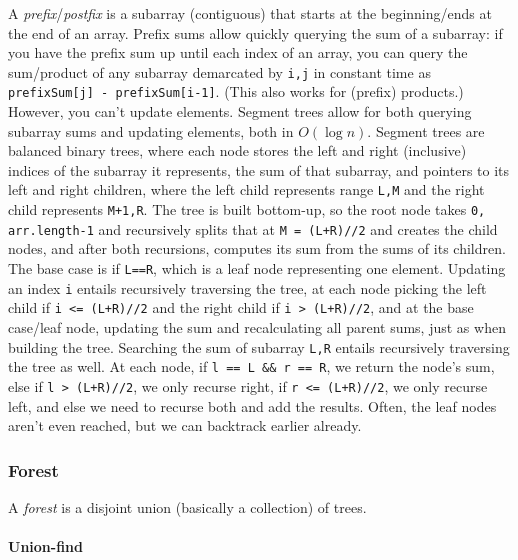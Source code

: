 \documentclass[table, xcdraw]{article}%
\begin{document}
A \emph{prefix}/\emph{postfix} is a subarray (contiguous) that starts at the beginning/ends at the end of an array. Prefix sums allow quickly querying the sum of a subarray: if you have the prefix sum up until each index of an array, you can query the sum/product of any subarray demarcated by \texttt{i,j} in constant time as \texttt{prefixSum[j] - prefixSum[i-1]}. (This also works for (prefix) products.) However, you can't update elements. Segment trees allow for both querying subarray sums and updating elements, both in $O(\log n)$. Segment trees are balanced binary trees, where each node stores the left and right (inclusive) indices of the subarray it represents, the sum of that subarray, and pointers to its left and right children, where the left child represents range \texttt{L,M} and the right child represents \texttt{M+1,R}. The tree is built bottom-up, so the root node takes \texttt{0, arr.length-1} and recursively splits that at \texttt{M = (L+R)//2} and creates the child nodes, and after both recursions, computes its sum from the sums of its children. The base case is if \texttt{L==R}, which is a leaf node representing one element.
Updating an index \texttt{i} entails recursively traversing the tree, at each node picking the left child if \texttt{i <= (L+R)//2} and the right child if \texttt{i > (L+R)//2}, and at the base case/leaf node, updating the sum and recalculating all parent sums, just as when building the tree.
Searching the sum of subarray \texttt{L,R} entails recursively traversing the tree as well. At each node, if \texttt{l == L && r == R}, we return the node's sum, else if \texttt{l > (L+R)//2}, we only recurse right, if \texttt{r <= (L+R)//2}, we only recurse left, and else we need to recurse both and add the results. Often, the leaf nodes aren't even reached, but we can backtrack earlier already.

\subsubsection{Forest}

A \emph{forest} is a disjoint union (basically a collection) of trees.

\paragraph{Union-find} \label{union_find}
\end{document}
